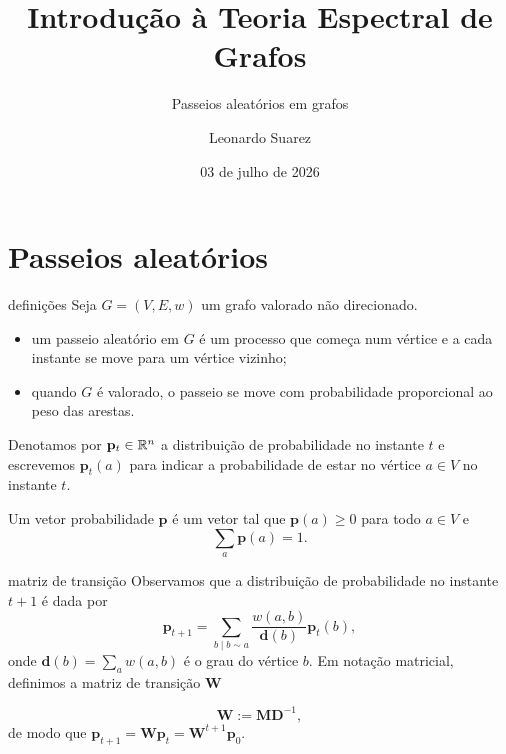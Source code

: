 \documentclass{beamer}
\title{Introdução à Teoria Espectral de Grafos}
\subtitle{Passeios aleatórios em grafos}
\date{03 de julho de 2026}
\author{Leonardo Suarez}
\institute{Instituto de Matemática e Estatística - UFRGS}
\begin{document}
\nocite{spielman}

\frame{\titlepage}

\begin{frame}
    \tableofcontents
\end{frame}

\section{Passeios aleatórios}

\begin{frame}{definições}
    Seja \(G = (V, E, w)\) um grafo valorado não direcionado.
    
    \begin{itemize}
        \item um \alert{passeio aleatório} em \(G\) é um processo que começa num vértice e a cada instante se move para um vértice vizinho;
        \item quando \(G\) é valorado, o passeio se move com probabilidade proporcional ao peso das arestas.
    \end{itemize}

    Denotamos por \(\mathbf{p}_t \in \mathbb{R}^n\) a distribuição de probabilidade no instante \(t\) e escrevemos \(\mathbf{p}_t(a)\) para indicar a probabilidade de estar no vértice \(a \in V\) no instante \(t\). 

    Um vetor probabilidade \(\mathbf{p}\) é um vetor tal que \(\mathbf{p}(a) \geq 0\) para todo \(a \in V\) e
    \begin{equation*}
        \sum_{a} \mathbf{p}(a) = 1.
    \end{equation*}
\end{frame}

\begin{frame}{matriz de transição}
    Observamos que a distribuição de probabilidade no instante \(t+1\) é dada por
    \begin{equation}
        \mathbf{p}_{t+1} = \sum_{b \mid b \sim a} \frac{w(a, b)}{\mathbf{d}(b)} \mathbf{p}_t(b),
    \end{equation} onde \(\mathbf{d}(b) = \sum_{a} w(a, b)\) é o grau do vértice \(b\). Em notação matricial, definimos a \alert{matriz de transição} \(\mathbf{W}\)

    \begin{equation}
        \mathbf{W} := \mathbf{M} \mathbf{D}^{-1},
    \end{equation} de modo que \(\mathbf{p}_{t+1} = \mathbf{W} \mathbf{p}_t = \mathbf{W}^{t+1}\mathbf{p}_0\).
\end{frame}
\end{document}
